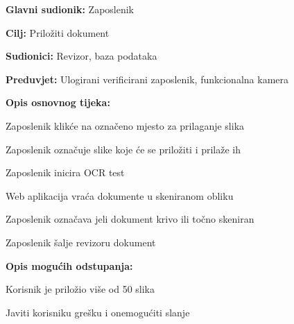 					\noindent {}
					\begin{packed_item}
	
						\item \textbf{Glavni sudionik:} Zaposlenik
						\item  \textbf{Cilj:} Priložiti dokument
						\item  \textbf{Sudionici:} Revizor, baza podataka
						\item  \textbf{Preduvjet:} Ulogirani verificirani zaposlenik, funkcionalna kamera
						\item  \textbf{Opis osnovnog tijeka:}
						
						\item[] \begin{packed_enum}
	
							\item Zaposlenik klikće na označeno mjesto za prilaganje slika
							\item Zaposlenik označuje slike koje će se priložiti i prilaže ih
							\item Zaposlenik inicira OCR test
							\item Web aplikacija vraća dokumente u skeniranom obliku
							\item Zaposlenik označava jeli dokument krivo ili točno skeniran
							\item Zaposlenik šalje revizoru dokument
							
							
						\end{packed_enum}
						
						\item  \textbf{Opis mogućih odstupanja:}
						
						\item[] \begin{packed_item}
	
							\item[1.] Korisnik je priložio više od 50 slika
							\item[] \begin{packed_enum}
								
								\item Javiti korisniku grešku i onemogućiti slanje
								
							\end{packed_enum}
							
						\end{packed_item}
					\end{packed_item}
				
